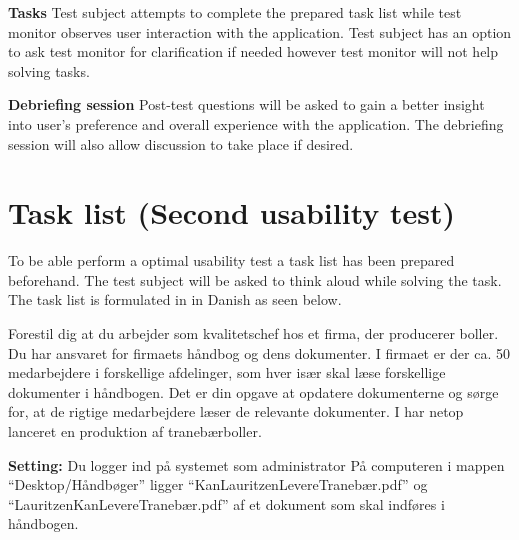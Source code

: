 \textbf{Tasks}
Test subject attempts to complete the prepared task list while test monitor observes user interaction with the application.
Test subject has an option to ask test monitor for clarification if needed however test monitor will not help solving tasks.

\textbf{Debriefing session}
Post-test questions will be asked to gain a better insight into user's preference and overall experience with the application.
The debriefing session will also allow discussion to take place if desired.

\section{Task list (Second usability test)} \label{sec:utest2tasklist}
To be able perform a optimal usability test a task list has been prepared beforehand.
The test subject will be asked to think aloud while solving the task.
The task list is formulated in in Danish as seen below.

Forestil dig at du arbejder som kvalitetschef hos et firma, der producerer boller.
Du har ansvaret for firmaets håndbog og dens dokumenter.
I firmaet er der ca. 50 medarbejdere i forskellige afdelinger, som hver især skal læse forskellige dokumenter i håndbogen.
Det er din opgave at opdatere dokumenterne og sørge for, at de rigtige medarbejdere læser de relevante dokumenter.
I har netop lanceret en produktion af tranebærboller.

\textbf{Setting:}
Du logger ind på systemet som administrator
På computeren i mappen “Desktop/Håndbøger” ligger “KanLauritzenLevereTranebær.pdf”  og “LauritzenKanLevereTranebær.pdf” af et dokument som skal indføres i håndbogen.

